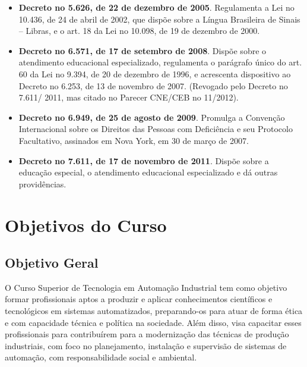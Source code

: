 \begin{itemize}
\item \textbf{Decreto no 5.626, de 22 de dezembro de 2005}. Regulamenta a Lei no 10.436, de 24 de abril de 2002, que dispõe sobre a Língua Brasileira de Sinais – Libras, e o art. 18 da Lei no 10.098, de 19 de dezembro de 2000.

\item \textbf{Decreto no 6.571, de 17 de setembro de 2008}. Dispõe sobre o atendimento
educacional especializado, regulamenta o parágrafo único do art. 60 da Lei no 9.394, de 20 de dezembro de 1996, e acrescenta dispositivo ao Decreto no 6.253, de 13 de novembro de 2007. (Revogado pelo Decreto no 7.611/ 2011, mas citado no Parecer CNE/CEB no 11/2012).

\item \textbf{Decreto no 6.949, de 25 de agosto de 2009}. Promulga a Convenção Internacional sobre os Direitos das Pessoas com Deficiência e seu Protocolo Facultativo, assinados em Nova York, em 30 de março de 2007.

\item \textbf{Decreto no 7.611, de 17 de novembro de 2011}. Dispõe sobre a educação especial, o atendimento educacional especializado e dá outras providências.

\end{itemize}

\chapter{Objetivos do Curso}

\section{Objetivo Geral}

O Curso Superior de Tecnologia em Automação Industrial tem como objetivo formar profissionais aptos a produzir e aplicar conhecimentos científicos e tecnológicos em sistemas automatizados, preparando-os para atuar de forma ética e com capacidade técnica e política na sociedade. Além disso, visa capacitar esses profissionais para contribuírem para a modernização das técnicas de produção industriais, com foco no planejamento, instalação e supervisão de sistemas de automação, com responsabilidade social e ambiental.\\



